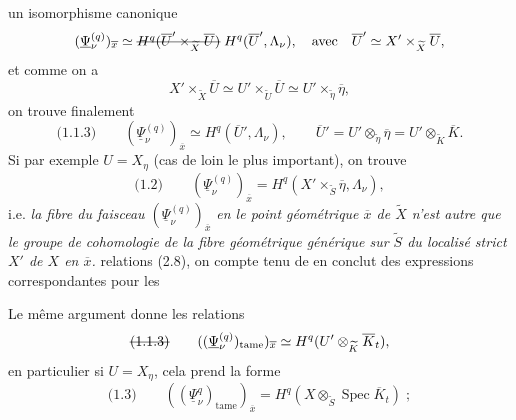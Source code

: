 \documentclass[11pt,a4paper]{article}
\begin{document}
un isomorphisme canonique
\[
(\underline{\Psi}^{(q)}_\nu)_{\overline{x}} \simeq \text{\struck{$H^q(\overline{U}' \times_{\widetilde{X}} \overline{U})$}} \; H^q(\overline{U}', \Lambda_\nu) , \quad \text{avec} \quad \overline{U}' \simeq X' \times_{\widetilde{X}} \overline{U} ,
\]
et comme on a
\[
X' \times_{\widetilde{X}} \overline{U} \simeq U' \times_{\widetilde{U}} \overline{U} \simeq U' \times_{\widetilde{\eta}} \overline{\eta} ,
\]
on trouve finalement
\[
\text{(1.1.3)} \qquad (\underline{\Psi}^{(q)}_\nu)_{\overline{x}} \simeq H^q(\overline{U}', \Lambda_\nu) , \qquad \overline{U}' = U' \otimes_{\widetilde{\eta}} \overline{\eta} = U' \otimes_{\widetilde{K}} \overline{K} .
\]
Si par exemple $U = X_\eta$ (cas de loin le plus important), on trouve
\[
\text{(1.2)} \qquad (\underline{\Psi}^{(q)}_\nu)_{\overline{x}} = H^q(X' \times_{\widetilde{S}} \overline{\eta}, \Lambda_\nu) ,
\]
i.e. \emph{la fibre du faisceau $(\underline{\Psi}^{(q)}_\nu)_{\overline{x}}$ en le point géométrique $\overline{x}$ de $\widetilde{X}$ \struck{\ill{}} n'est autre que le groupe de cohomologie  de la fibre géométrique générique sur $\widetilde{S}$ du localisé strict $X'$ de $X$ en $\overline{x}$.}  \struck{\ill{}} relations (2.8), on \struck{\ill{}} \ill{} compte tenu de \struck{\ill{}} en conclut des expressions correspondantes pour les 

  Le même argument donne les relations
\[
\text{\struck{(1.1.3)}} \qquad ((\underline{\Psi}^{(q)}_\nu)_{\mathrm{tame}})_{\overline{x}} \simeq H^q(U' \otimes_{\widetilde{K}} \overline{K}_t) ,
\]
en particulier si $U = X_\eta$, cela  prend la forme
\[
\text{(1.3)} \qquad ((\underline{\Psi}^q_\nu)_{\mathrm{tame}})_{\overline{x}} = H^q(X \otimes_{\widetilde{S}} \operatorname{Spec} \overline{K}_t) \; ;
\]
\struck{\ill{}}


\end{document}
